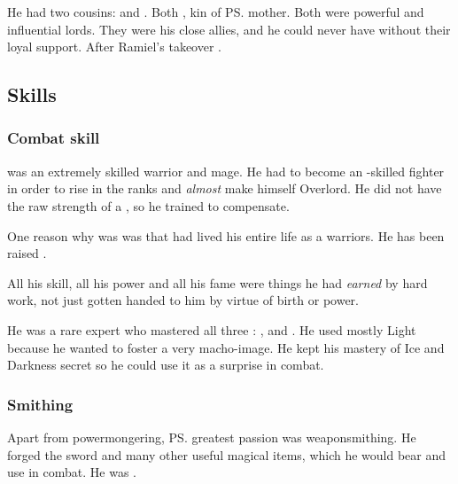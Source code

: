 He had two cousins: 
\Sargamel and \Themirod. 
Both \thelyadeth, kin of \ps{\Dasteron} mother. 
Both were powerful and influential \Mystraacht lords. 
They were his close allies, and he could never have  without their loyal support. 
After Ramiel's takeover . 









\subsection{Skills}





\subsubsection{Combat skill}
\Dasteron{} was an extremely skilled warrior and mage. 
He had to become an \uber-skilled fighter in order to rise in the \Mystraacht{} ranks and \emph{almost} make himself Overlord. 
He did not have the raw strength of a \sathariah, so he trained to compensate. 

One reason why \Dasteron{} was  was that \Dasteron{} had lived his entire life as a \Mystraacht{} warriors. 
He has been raised . 

All his skill, all his power and all his fame were things he had \emph{earned} by hard work, not just gotten handed to him by virtue of birth or \sathariah{} power. 

He was a rare expert who mastered all three : 
,  and . 
He used mostly Light because he wanted to foster a very \Mystraacht{} macho-image. 
He kept his mastery of Ice and Darkness secret so he could use it as a surprise in combat. 





\subsubsection{Smithing}
Apart from powermongering, \ps{\Dasteron} greatest passion was weaponsmithing. 
He forged the sword  and many other useful magical items, which he would bear and use in combat. 
He was . 
















